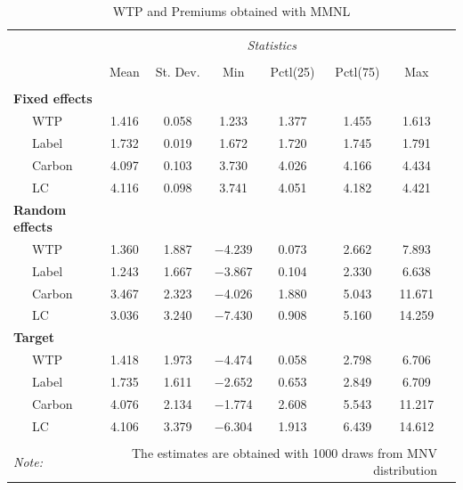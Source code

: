 \documentclass[12pt,]{article}
\begin{document}
\begin{table}[!htbp] \centering 
  \caption{WTP and Premiums obtained with MMNL} 
  \label{tab:wtpr} 
\begin{tabular}{@{\extracolsep{5pt}}lccccccc} 
\\[-1.8ex]\hline 
\hline \\[-1.8ex]  
& \multicolumn{6}{c}{\textit{Statistics}} \\
\cline{2-7} 
\\[-1.8ex] & \multicolumn{1}{c}{Mean} & \multicolumn{1}{c}{St. Dev.} & \multicolumn{1}{c}{Min} & \multicolumn{1}{c}{Pctl(25)} & \multicolumn{1}{c}{Pctl(75)} & \multicolumn{1}{c}{Max} \\ 
\hline \\[-1.8ex] 
\textbf{Fixed effects} & & & & & & \\
  ~~~WTP & 1.416 & 0.058 & 1.233 & 1.377 & 1.455 & 1.613 \\ 
  ~~~Label & 1.732 & 0.019 & 1.672 & 1.720 & 1.745 & 1.791 \\ 
  ~~~Carbon & 4.097 & 0.103 & 3.730 & 4.026 & 4.166 & 4.434 \\ 
  ~~~LC & 4.116 & 0.098 & 3.741 & 4.051 & 4.182 & 4.421 \\ 
\textbf{Random effects} & & & & & & \\ 
  ~~~WTP & 1.360 & 1.887 & $-$4.239 & 0.073 & 2.662 & 7.893 \\ 
  ~~~Label & 1.243 & 1.667 & $-$3.867 & 0.104 & 2.330 & 6.638 \\ 
  ~~~Carbon & 3.467 & 2.323 & $-$4.026 & 1.880 & 5.043 & 11.671 \\ 
  ~~~LC & 3.036 & 3.240 & $-$7.430 & 0.908 & 5.160 & 14.259 \\ 
\textbf{Target} & & & & & & \\
  ~~~WTP & 1.418 & 1.973 & $-$4.474 & 0.058 & 2.798 & 6.706 \\
  ~~~Label & 1.735 & 1.611 & $-$2.652 & 0.653 & 2.849 & 6.709 \\ 
  ~~~Carbon & 4.076 & 2.134 & $-$1.774 & 2.608 & 5.543 & 11.217 \\ 
  ~~~LC & 4.106 & 3.379 & $-$6.304 & 1.913 & 6.439 & 14.612 \\ 
\hline \\[-1.8ex] 
\textit{Note:}  & \multicolumn{6}{r}{The estimates are obtained with 1000 draws from MNV distribution} \\ 
\end{tabular} 
\end{table}
\end{document}
